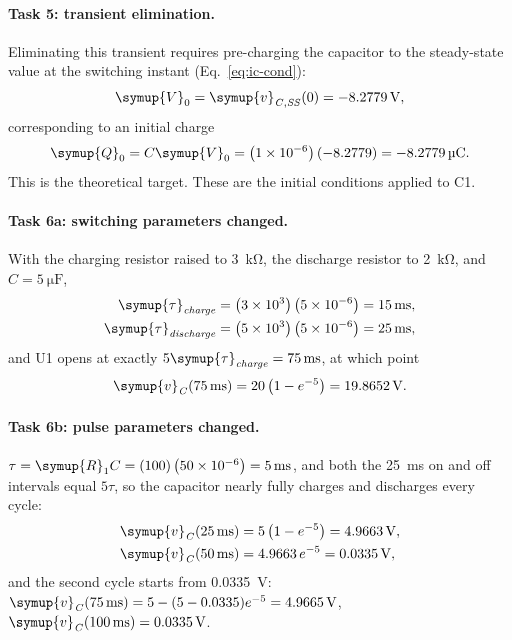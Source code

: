 \documentclass[12pt,a4paper]{article}
\begin{document}
	\paragraph{Task 5: transient elimination.}
	Eliminating this transient requires pre-charging the capacitor to
	the steady-state value at the switching instant
	(Eq.~\eqref{eq:ic-cond}):
	\begin{equation}
		\symup{V}_{0} = \symup{v}_{\mathit{C,SS}}(0) = \SI{-8.2779}{\volt},
	\end{equation}
	corresponding to an initial charge
	\begin{equation}
		\symup{Q}_{0} = C \symup{V}_{0} = \left(1\times10^{-6}\right)(-8.2779)
		= \SI{-8.2779}{\micro\coulomb}.
	\end{equation}
	This is the theoretical target. These are the initial conditions applied to C1.
	
	\paragraph{Task 6a: switching parameters changed.}
	With the charging resistor raised to \SI{3}{\kilo\ohm}, the
	discharge resistor to \SI{2}{\kilo\ohm}, and
	$C = \SI{5}{\micro\farad}$,
	\begin{align}
		\symup{\tau}_{\mathit{charge}} &= \left(3\times 10^{3}\right)\left(5\times 10^{-6}\right)
		= \SI{15}{\milli\second}, \\
		\symup{\tau}_{\mathit{discharge}} &= \left(5\times 10^{3}\right)\left(5\times 10^{-6}\right)
		= \SI{25}{\milli\second},
	\end{align}
	and U1 opens at exactly $5\symup{\tau}_{\mathit{charge}} =
	\SI{75}{\milli\second}$, at which point
	\begin{equation}
		\symup{v}_{\mathit{C}}(\SI{75}{\milli\second}) = 20\left(1 - e^{-5}\right)
		= \SI{19.8652}{\volt}.
	\end{equation}
	
	\paragraph{Task 6b: pulse parameters changed.}
	$\tau = \symup{R}_{1} C = (100)\left(50\times 10^{-6}\right) =
	\SI{5}{\milli\second}$, and both the \SI{25}{\milli\second} on and
	off intervals equal $5\tau$, so the capacitor nearly fully charges
	and discharges every cycle:
	\begin{align}
		\symup{v}_{\mathit{C}}(\SI{25}{\milli\second}) &= 5\left(1 - e^{-5}\right)
		= \SI{4.9663}{\volt},\\
		\symup{v}_{\mathit{C}}(\SI{50}{\milli\second}) &= 4.9663\, e^{-5} = \SI{0.0335}{\volt},
	\end{align}
	and the second cycle starts from \SI{0.0335}{\volt}:
	$\symup{v}_{\mathit{C}}(\SI{75}{\milli\second}) = 5 - (5 - 0.0335)e^{-5} =
	\SI{4.9665}{\volt}$, $\symup{v}_{\mathit{C}}(\SI{100}{\milli\second}) = \SI{0.0335}{\volt}$.
	
\end{document}
